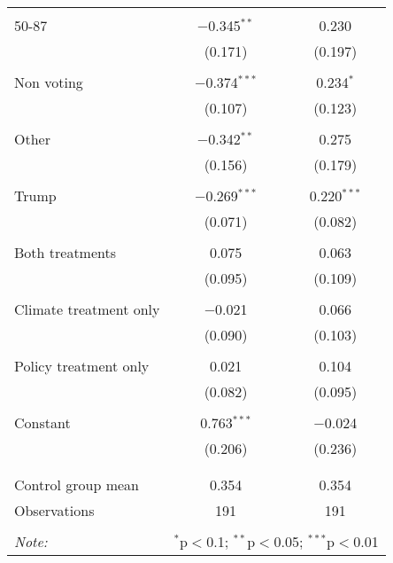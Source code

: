 \begin{tabular}{@{\extracolsep{5pt}}lcc}
  & & \\ 
 50-87 & $-$0.345$^{**}$ & 0.230 \\ 
  & (0.171) & (0.197) \\ 
  & & \\ 
 Non voting & $-$0.374$^{***}$ & 0.234$^{*}$ \\ 
  & (0.107) & (0.123) \\ 
  & & \\ 
 Other & $-$0.342$^{**}$ & 0.275 \\ 
  & (0.156) & (0.179) \\ 
  & & \\ 
 Trump & $-$0.269$^{***}$ & 0.220$^{***}$ \\ 
  & (0.071) & (0.082) \\ 
  & & \\ 
 Both treatments & 0.075 & 0.063 \\ 
  & (0.095) & (0.109) \\ 
  & & \\ 
 Climate treatment only & $-$0.021 & 0.066 \\ 
  & (0.090) & (0.103) \\ 
  & & \\ 
 Policy treatment only & 0.021 & 0.104 \\ 
  & (0.082) & (0.095) \\ 
  & & \\ 
 Constant & 0.763$^{***}$ & $-$0.024 \\ 
  & (0.206) & (0.236) \\ 
  & & \\ 
\hline \\[-1.8ex] 
Control group mean & 0.354 & 0.354 \\ 
Observations & 191 & 191 \\ 
\hline 
\hline \\[-1.8ex] 
\textit{Note:}  & \multicolumn{2}{r}{$^{*}$p$<$0.1; $^{**}$p$<$0.05; $^{***}$p$<$0.01} \\ 
\end{tabular} 
